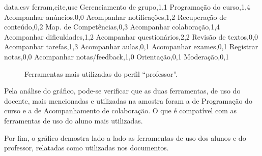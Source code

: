 \begin{filecontents}{data.csv}
ferram,cite,use
Gerenciamento de grupo,1,1
Programação do curso,1,4
Acompanhar anúncios,0,0
Acompanhar notificações,1,2
Recuperação de conteúdo,0,2
Map. de Competências,0,3
Acompanhar colaboração,1,4
Acompanhar dificuldades,1,2
Acompanhar questionários,2,2
Revisão de textos,0,0
Acompanhar tarefas,1,3
Acompanhar aulas,0,1
Acompanhar exames,0,1
Registrar notas,0,0
Acompanhar notas/feedback,1,0
Orientação,0,1
Moderação,0,1
\end{filecontents}
\datatable

\begin{figure}[ht!]
    \centering
    \label{fig:ferram_maisutilprofe}
    \caption{Ferramentas mais utilizadas do perfil ``professor''.}
\end{figure}

Pela análise do gráfico, pode-se verificar que as duas ferramentas, de uso do docente, mais mencionadas e utilizadas na amostra foram a de Programação do curso e a de Acompanhamento de colaboração. O que é compatível com as ferramentas de uso do aluno mais utilizadas.

Por fim, o gráfico  demostra lado a lado as ferramentas de uso dos alunos e do professor, relatadas como utilizadas nos documentos. 

